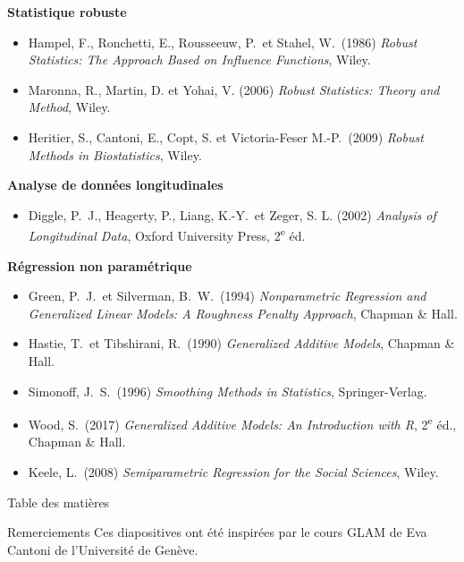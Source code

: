 \documentclass{BeamerTemplate}
\begin{document}
\begin{frame}
\textbf{Statistique robuste}
\begin{itemize}
\item Hampel, F., Ronchetti, E., Rousseeuw, P.\ et Stahel, W.\ (1986) \textit{Robust Statistics: The Approach Based on Influence Functions}, Wiley.
\item Maronna, R., Martin, D. et Yohai, V. (2006) \textit{Robust Statistics: Theory and Method}, Wiley.
\item Heritier, S., Cantoni, E., Copt, S. et Victoria-Feser M.-P.\ (2009) \textit{Robust Methods in Biostatistics}, Wiley.
\end{itemize}

\textbf{Analyse de données longitudinales}
\begin{itemize}
\item Diggle, P.\ J., Heagerty, P., Liang, K.-Y.\ et Zeger, S. L. (2002) \textit{Analysis of Longitudinal Data}, Oxford University Press, 2\textsuperscript{e} éd.
\end{itemize}
\end{frame}


\begin{frame}
\textbf{Régression non paramétrique}
\begin{itemize}
\item Green, P.\ J.\ et Silverman, B.\ W.\ (1994) \textit{Nonparametric Regression and Generalized Linear Models: A Roughness Penalty Approach}, Chapman \& Hall.
\item Hastie, T.\ et Tibshirani, R.\ (1990) \textit{Generalized Additive Models}, Chapman \& Hall.
\item Simonoff, J.\ S.\ (1996) \textit{Smoothing Methods in Statistics}, Springer-Verlag.
\item Wood, S.\ (2017) \textit{Generalized Additive Models: An Introduction with R}, 2\textsuperscript{e} éd., Chapman \& Hall.
\item Keele, L.\ (2008) \textit{Semiparametric Regression for the Social Sciences}, Wiley.
\end{itemize}
\end{frame}


\begin{frame}{Table des matières}
\setcounter{tocdepth}{1}
\tableofcontents
\end{frame}




\begin{frame}{Remerciements}
Ces diapositives ont été inspirées par le cours GLAM de Eva Cantoni de l'Université de Genève.
\end{frame}
\end{document}
